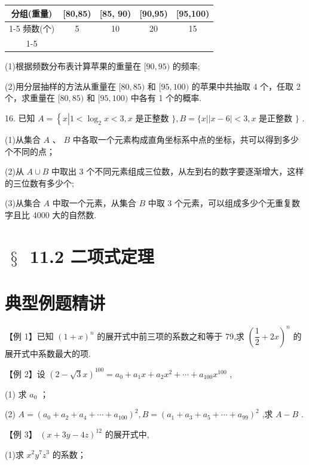 \begin{center}
\begin{tabular}{|c|c|c|c|c|}
\hline
分组(重量) & [80,85) & [85, 90) & [90,95) & [95,100) \\
\cline{1-5}
频数(个) & 5 & 10 & 20 & 15 \\
\cline{1-5}
\hline
\end{tabular}
\end{center}

(1)根据频数分布表计算苹果的重量在 $\lbrack {90},{95})$ 的频率;

(2)用分层抽样的方法从重量在 $\lbrack {80},{85})$ 和 $\lbrack {95},{100})$ 的苹果中共抽取 4 个，任取 2 个，求重量在 $\lbrack {80},{85})$ 和 $\lbrack {95},{100})$ 中各有 1 个的概率.

16. 已知 $A = \left\{  {x\left| {1 < {\log }_{2}x < 3}\right. }\right. ,x$ 是正整数 $\} ,B = \{ x\left| \right| x - 6 \mid   < 3,x$ 是正整数 $\}$ .

(1)从集合 $A$ 、 $B$ 中各取一个元素构成直角坐标系中点的坐标，共可以得到多少个不同的点；

(2)从 $A \cup  B$ 中取出 3 个不同元素组成三位数，从左到右的数字要逐渐增大，这样的三位数有多少个;

(3)从集合 $A$ 中取一个元素，从集合 $B$ 中取 3 个元素，可以组成多少个无重复数字且比 4000 大的自然数.

\section*{$\text{ § }$ 11.2 二项式定理}

\section*{典型例题精讲}

【例 1】已知 ${\left( 1 + x\right) }^{n}$ 的展开式中前三项的系数之和等于 79,求 ${\left( \dfrac{1}{2} + 2x\right) }^{n}$ 的展开式中系数最大的项.

【例 2】设 ${\left( 2 - \sqrt{3}x\right) }^{100} = {a}_{0} + {a}_{1}x + {a}_{2}{x}^{2} + \cdots  + {a}_{100}{x}^{100}$ ,

(1) 求 ${a}_{0}$ ；

(2) $A = {\left( {a}_{0} + {a}_{2} + {a}_{4} + \cdots  + {a}_{100}\right) }^{2},B = {\left( {a}_{1} + {a}_{3} + {a}_{5} + \cdots  + {a}_{99}\right) }^{2}$ ,求 $A - B$ .

【例 3】 ${\left( x + 3y - 4z\right) }^{12}$ 的展开式中,

(1)求 ${x}^{2}{y}^{7}{z}^{3}$ 的系数；

